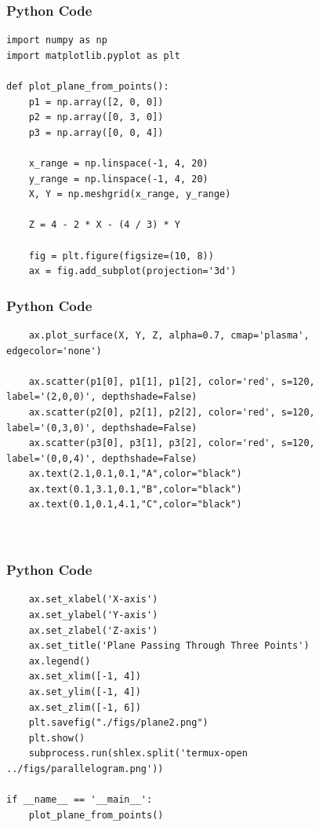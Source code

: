 \documentclass{beamer}
\begin{document}
\begin{frame}[fragile]
    \frametitle{Python Code}
    \begin{lstlisting}
import numpy as np
import matplotlib.pyplot as plt

def plot_plane_from_points():
    p1 = np.array([2, 0, 0])
    p2 = np.array([0, 3, 0])
    p3 = np.array([0, 0, 4])

    x_range = np.linspace(-1, 4, 20)
    y_range = np.linspace(-1, 4, 20)
    X, Y = np.meshgrid(x_range, y_range)

    Z = 4 - 2 * X - (4 / 3) * Y

    fig = plt.figure(figsize=(10, 8))
    ax = fig.add_subplot(projection='3d')

\end{lstlisting}
\end{frame}
\begin{frame}[fragile]
    \frametitle{Python Code}
    \begin{lstlisting}
    ax.plot_surface(X, Y, Z, alpha=0.7, cmap='plasma', edgecolor='none')

    ax.scatter(p1[0], p1[1], p1[2], color='red', s=120, label='(2,0,0)', depthshade=False)
    ax.scatter(p2[0], p2[1], p2[2], color='red', s=120, label='(0,3,0)', depthshade=False)
    ax.scatter(p3[0], p3[1], p3[2], color='red', s=120, label='(0,0,4)', depthshade=False)
    ax.text(2.1,0.1,0.1,"A",color="black")
    ax.text(0.1,3.1,0.1,"B",color="black")
    ax.text(0.1,0.1,4.1,"C",color="black")



\end{lstlisting}
\end{frame}
\begin{frame}[fragile]
    \frametitle{Python Code}
    \begin{lstlisting}
    ax.set_xlabel('X-axis')
    ax.set_ylabel('Y-axis')
    ax.set_zlabel('Z-axis')
    ax.set_title('Plane Passing Through Three Points')
    ax.legend()
    ax.set_xlim([-1, 4])
    ax.set_ylim([-1, 4])
    ax.set_zlim([-1, 6])
    plt.savefig("./figs/plane2.png")
    plt.show()
    subprocess.run(shlex.split('termux-open ../figs/parallelogram.png'))

if __name__ == '__main__':
    plot_plane_from_points()
\end{lstlisting}
\end{frame}
\end{document}
